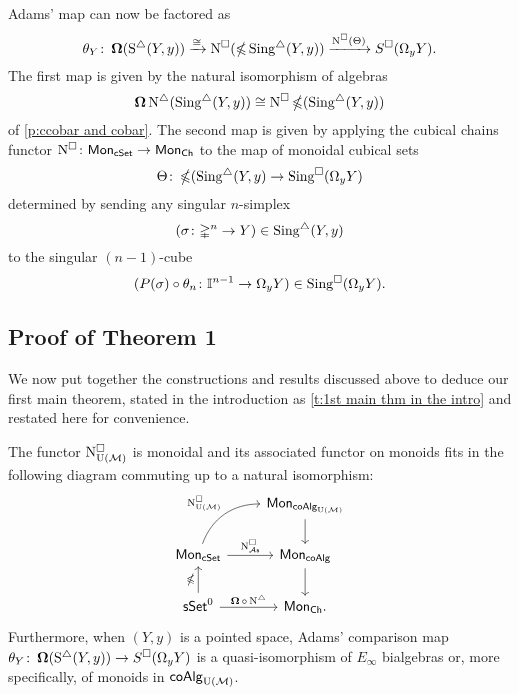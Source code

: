 Adams' map can now be factored as 
$$\theta_Y \colon \operatorname{\mathbf{\Omega}}(\operatorname{S^{\triangle}}(Y, y)) \xrightarrow{\cong} 
\operatorname{N^{\square}}(\operatorname{\mathbb{\Omega}} \operatorname{Sing^{\triangle}}(Y, y)) \xrightarrow{\operatorname{N^{\square}}(\Theta)} 
S^{\square}(\Omega_y Y).$$
The first map is given by the natural isomorphism of algebras $$\operatorname{\mathbf{\Omega}} \operatorname{N^{\triangle}} (\operatorname{Sing^{\triangle}}(Y, y)) \cong  \operatorname{N^{\square}} \operatorname{\mathbb{\Omega}} (\operatorname{Sing^{\triangle}}(Y, y))$$ of \cref{p:ccobar and cobar}.
The second map is given by applying the cubical chains functor $\operatorname{N^{\square}} \colon \mathsf{Mon}_{\mathsf{cSet}} \to \mathsf{Mon}_{\mathsf{Ch}}$ to the map of monoidal cubical sets
$$\Theta \colon \operatorname{\mathbb{\Omega}} (\operatorname{Sing^{\triangle}}(Y, y) \to \operatorname{Sing^{\square}}( \Omega_yY)$$
determined by sending any singular $n$-simplex $$(\sigma\colon \mathbb{\Delta}^n \to Y) \in \operatorname{Sing^{\triangle}}(Y, y)$$ to the singular $(n-1)$-cube $$(P(\sigma) \circ \theta_n \colon \mathbb{I}^{n-1} \to \Omega_yY) \in \operatorname{Sing^{\square}}( \Omega_yY).$$ 

\subsection{Proof of Theorem 1}

We now put together the constructions and results discussed above to deduce our first main theorem, stated in the introduction as \cref{t:1st main thm in the intro} and restated here for convenience.

\begin{nntheorem}
	The functor $\operatorname{N^{\square}_{{\operatorname{U}(\mathcal{M})}}}$ is monoidal and its associated functor on monoids fits in the following diagram commuting up to a natural isomorphism:
	\begin{equation*}
	\begin{tikzcd}
	& \Mon_{\coAlg_\UM} \arrow[d] \\
	\Mon_{\cSet} \arrow[ru, "\cchainsUM", out=70, in=180] \arrow[r, "\cchainsAS"]
	& \Mon_{\coAlg} \arrow[d] \\
	\sSet^0 \arrow[r, "\cobar \circ \schains"] \arrow[u, "\ccobar"]
	& \Mon_{\Ch}.
	\end{tikzcd}
	\end{equation*}
	Furthermore, when $(Y, y)$ is a pointed space, Adams' comparison map $\theta_Y \colon \operatorname{\mathbf{\Omega}}(\operatorname{S^{\triangle}}(Y, y)) \to S^{\square}(\Omega_y Y)$ is a quasi-isomorphism of $E_\infty$ bialgebras or, more specifically, of monoids in $\mathsf{coAlg}_{\operatorname{U}(\mathcal{M})}$.
\end{nntheorem} 

